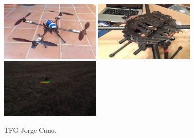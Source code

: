 \begin{figure}[H]
 \centering
    \includegraphics[width=5cm,height=3cm]{imgs/JorgeCano1_1.jpg}
    \includegraphics[width=5cm,height=3cm]{imgs/JorgeCano2_1.jpg}
    \includegraphics[width=5cm,height=3cm]{imgs/JorgeCano3_1.png}
 \caption{TFG Jorge Cano.}
 \label{f:JorgeCano}
\end{figure} 




